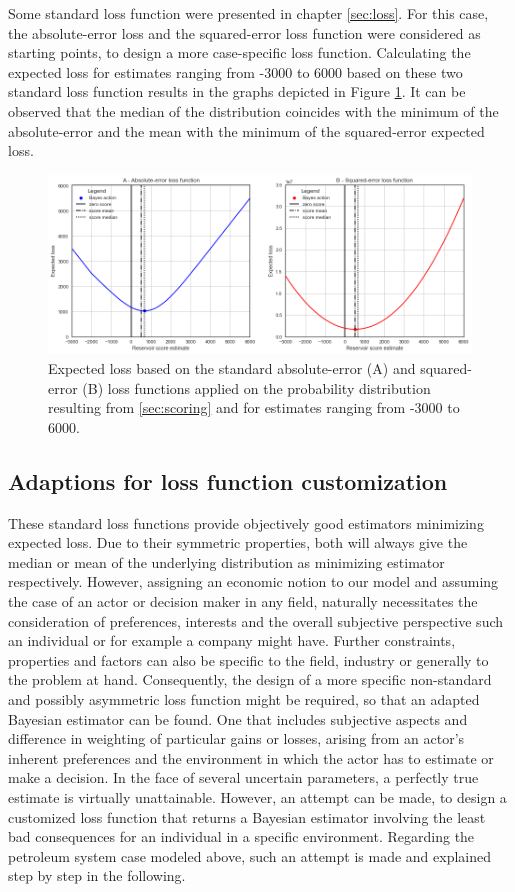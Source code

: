 	Some standard loss function were presented in chapter \ref{sec:loss}. For this case, the absolute-error loss and the squared-error loss function were considered as starting points, to design a more case-specific loss function. 	
	Calculating the expected loss for estimates ranging from -3000 to 6000 based on these two standard loss function results in the graphs depicted in Figure \ref{fig:abs_sqr_LF}. It can be observed that the median of the distribution coincides with the minimum of the absolute-error and the mean with the minimum of the squared-error expected loss.
	
	\begin{figure}[h]
		\centering
		\includegraphics[width=1\textwidth]{Figures/abs_sqr_LF.png}
		\caption{Expected loss based on the standard absolute-error (A) and squared-error (B) loss functions applied on the probability distribution resulting from \ref{sec:scoring} and for estimates ranging from -3000 to 6000.}\label{fig:abs_sqr_LF}
	\end{figure}
	
	\subsection{Adaptions for loss function customization}
	
	These standard loss functions provide objectively good estimators minimizing expected loss. Due to their symmetric properties, both will always give the median or mean of the underlying distribution as minimizing estimator respectively. However, assigning an economic notion to our model and assuming the case of an actor or decision maker in any field, naturally necessitates the consideration of preferences, interests and the overall subjective perspective such an individual or for example a company might have. Further constraints, properties and factors can also be specific to the field, industry or generally to the problem at hand. Consequently, the design of a more specific non-standard and possibly asymmetric loss function might be required, so that an adapted Bayesian estimator can be found. One that includes subjective aspects and difference in weighting of particular gains or losses, arising from an actor's inherent preferences and the environment in which the actor has to estimate or make a decision. In the face of several uncertain parameters, a perfectly true estimate is virtually unattainable. However, an attempt can be made, to design a customized loss function that returns a Bayesian estimator involving the least bad consequences for an individual in a specific environment. Regarding the petroleum system case modeled above, such an attempt is made and explained step by step in the following. 
	

